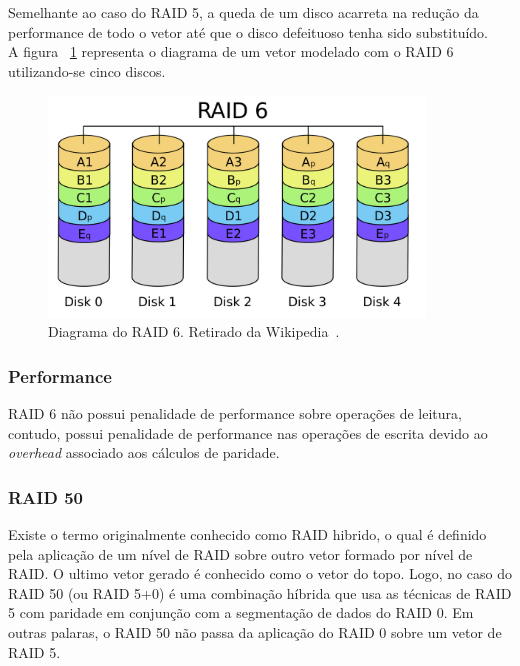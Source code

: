 		Semelhante ao caso do RAID 5, a queda de um disco acarreta na redução da performance de todo o vetor até que o disco defeituoso tenha sido substituído.\\

		
		A figura ~\ref{fig:raid6} representa o diagrama de um vetor modelado com o RAID 6 utilizando-se cinco discos.\\
		
		\begin{figure}[htb]
			\begin{center}
				
				\includegraphics[clip,width=10.0cm]{images/RAID_6.png}
				\caption{Diagrama do RAID 6. Retirado da Wikipedia~\citep{wikiRAIDlevels}.}
				\label{fig:raid6}
			\end{center}
		\end{figure} 
		
		\subsubsection{Performance}
		RAID 6 não possui penalidade de performance sobre operações de leitura, contudo, possui penalidade de performance nas operações de escrita devido ao \textit{overhead} associado aos cálculos de paridade.\\
		
		
		\subsubsection{RAID 50}
		Existe o termo originalmente conhecido como RAID hibrido, o qual é definido pela aplicação de um nível de RAID sobre outro vetor formado por nível de RAID. O ultimo vetor gerado é conhecido como o 
		vetor do topo. Logo, no caso do RAID 50 (ou RAID 5+0) é uma combinação híbrida que usa as técnicas de RAID 5 com paridade em conjunção com a segmentação de dados do RAID 0. Em outras palaras, o RAID 50 não passa da aplicação do RAID 0 sobre um vetor de RAID 5. \\
		
